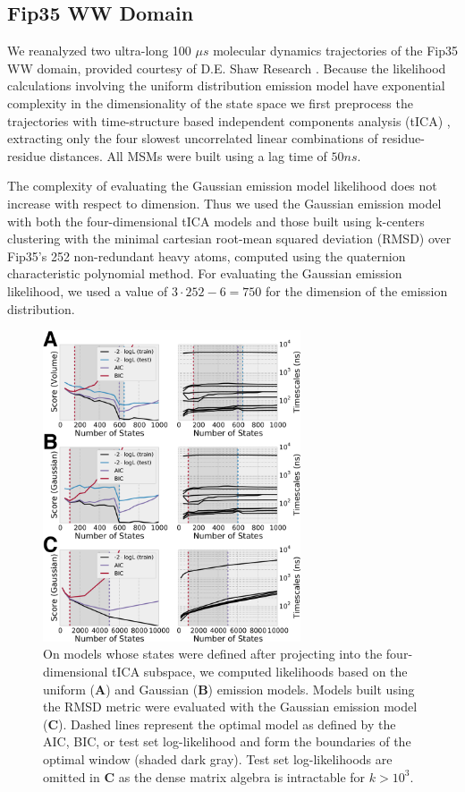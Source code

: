 \documentclass[journal=jpcbfk, layout=twocolumn, manuscript=article]{achemso}
\begin{document}
\subsection{Fip35 WW Domain}

We reanalyzed two ultra-long 100 $\mu s$ molecular dynamics trajectories of the Fip35 WW domain\cite{Liu2008Experimental}, provided courtesy of D.E. Shaw Research \cite{Shaw2010Atomic}. Because the likelihood calculations involving the uniform distribution emission model have exponential complexity in the dimensionality of the state space we first preprocess the trajectories with time-structure based independent components analysis (tICA) \cite{Schwantes2013Improvements, Perez2013Identification}, extracting only the four slowest uncorrelated linear combinations of residue-residue distances. All MSMs were built using a lag time of $50 ns$.

The complexity of evaluating the Gaussian emission model likelihood does not increase with respect to dimension. Thus we used the Gaussian emission model with both the four-dimensional tICA models and those built using k-centers clustering with the minimal cartesian root-mean squared deviation (RMSD) over Fip35's 252 non-redundant heavy atoms, computed using the quaternion characteristic polynomial method\cite{Theobald2005Rapid}. For evaluating the Gaussian emission likelihood, we used a value of $3 \cdot 252 - 6 = 750$ for the dimension of the emission distribution.

\begin{figure}
\centering
\includegraphics[width=3in]{figs_final/ww_likes.png}
\caption{On models whose states were defined after projecting into the four-dimensional tICA subspace, we computed likelihoods based on the uniform ({\bf A}) and Gaussian ({\bf B}) emission models. Models built using the RMSD metric were evaluated with the Gaussian emission model ({\bf C}). Dashed lines represent the optimal model as defined by the AIC, BIC, or test set log-likelihood and form the boundaries of the optimal window (shaded dark gray). Test set log-likelihoods are omitted in {\bf C} as the dense matrix algebra is intractable for $k > 10^3$.\label{fig:ww}}
\end{figure}
\end{document}
